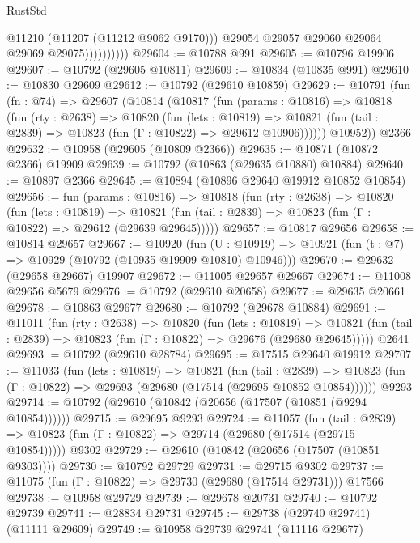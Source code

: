 \begin{lexlean}{RustStd}
\begin{coremodule}
                          @11210
                          (@11207 (@11212 @9062 @9170)))
                        @29054
                        @29057
                        @29060
                        @29064
                        @29069
                        @29075))))))))))
@29604 := @10788 @991
@29605 := @10796 @19906
@29607 := @10792 (@29605 @10811)
@29609 := @10834 (@10835 @991)
@29610 := @10830 @29609
@29612 := @10792 (@29610 @10859)
@29629 := @10791
    (fun (fn : @74) =>
    @29607
      (@10814
        (@10817
          (fun (params : @10816) =>
          @10818
            (fun (rty : @2638) =>
            @10820
              (fun (lets : @10819) =>
              @10821 (fun (tail : @2839) => @10823 (fun (Γ : @10822) => @29612 @10906))))))
        @10952))
    @2366
@29632 := @10958 (@29605 (@10809 @2366))
@29635 := @10871 (@10872 @2366) @19909
@29639 := @10792 (@10863 (@29635 @10880) @10884)
@29640 := @10897 @2366
@29645 := @10894 (@10896 @29640 @19912 @10852 @10854)
@29656 := fun (params : @10816) =>
  @10818
    (fun (rty : @2638) =>
    @10820
      (fun (lets : @10819) =>
      @10821 (fun (tail : @2839) => @10823 (fun (Γ : @10822) => @29612 (@29639 @29645)))))
@29657 := @10817 @29656
@29658 := @10814 @29657
@29667 := @10920
    (fun (U : @10919) => @10921 (fun (t : @7) => @10929 (@10792 (@10935 @19909 @10810) @10946)))
@29670 := @29632 (@29658 @29667) @19907
@29672 := @11005 @29657 @29667
@29674 := @11008 @29656 @5679
@29676 := @10792 (@29610 @20658)
@29677 := @29635 @20661
@29678 := @10863 @29677
@29680 := @10792 (@29678 @10884)
@29691 := @11011
    (fun (rty : @2638) =>
    @10820
      (fun (lets : @10819) =>
      @10821 (fun (tail : @2839) => @10823 (fun (Γ : @10822) => @29676 (@29680 @29645)))))
    @2641
@29693 := @10792 (@29610 @28784)
@29695 := @17515 @29640 @19912
@29707 := @11033
    (fun (lets : @10819) =>
    @10821
      (fun (tail : @2839) =>
      @10823 (fun (Γ : @10822) => @29693 (@29680 (@17514 (@29695 @10852 @10854))))))
    @9293
@29714 := @10792 (@29610 (@10842 (@20656 (@17507 (@10851 (@9294 @10854))))))
@29715 := @29695 @9293
@29724 := @11057
    (fun (tail : @2839) => @10823 (fun (Γ : @10822) => @29714 (@29680 (@17514 (@29715 @10854)))))
    @9302
@29729 := @29610 (@10842 (@20656 (@17507 (@10851 @9303))))
@29730 := @10792 @29729
@29731 := @29715 @9302
@29737 := @11075 (fun (Γ : @10822) => @29730 (@29680 (@17514 @29731))) @17566
@29738 := @10958 @29729
@29739 := @29678 @20731
@29740 := @10792 @29739
@29741 := @28834 @29731
@29745 := @29738 (@29740 @29741) (@11111 @29609)
@29749 := @10958 @29739 @29741 (@11116 @29677)

\end{coremodule}
\end{lexlean}
